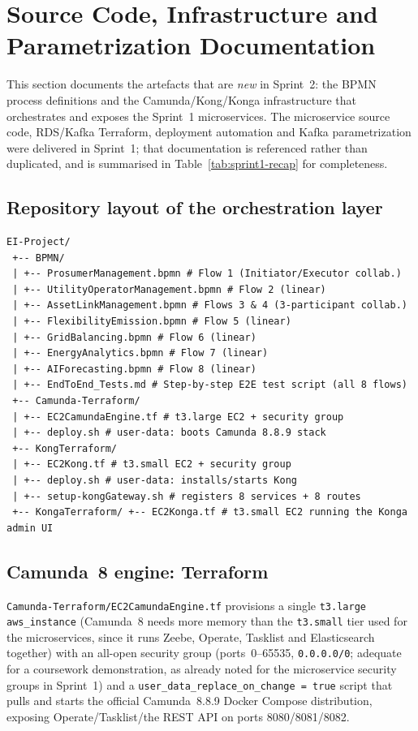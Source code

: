 \documentclass[11pt,a4paper]{article}
\begin{document}
\section{Source Code, Infrastructure and Parametrization Documentation}
\label{sec:docs}
 
This section documents the artefacts that are \emph{new} in Sprint~2:
the BPMN process definitions and the Camunda/Kong/Konga infrastructure that
orchestrates and exposes the Sprint~1 microservices. The microservice source
code, RDS/Kafka Terraform, deployment automation and Kafka parametrization
were delivered in Sprint~1;
that documentation is referenced rather than duplicated, and is summarised in
Table~\ref{tab:sprint1-recap} for completeness.
 
\subsection{Repository layout of the orchestration layer}
 
\begin{lstlisting}[caption={Layout of the new orchestration-layer artefacts inside the project repository}]
EI-Project/
 +-- BPMN/
 | +-- ProsumerManagement.bpmn # Flow 1 (Initiator/Executor collab.)
 | +-- UtilityOperatorManagement.bpmn # Flow 2 (linear)
 | +-- AssetLinkManagement.bpmn # Flows 3 & 4 (3-participant collab.)
 | +-- FlexibilityEmission.bpmn # Flow 5 (linear)
 | +-- GridBalancing.bpmn # Flow 6 (linear)
 | +-- EnergyAnalytics.bpmn # Flow 7 (linear)
 | +-- AIForecasting.bpmn # Flow 8 (linear)
 | +-- EndToEnd_Tests.md # Step-by-step E2E test script (all 8 flows)
 +-- Camunda-Terraform/
 | +-- EC2CamundaEngine.tf # t3.large EC2 + security group
 | +-- deploy.sh # user-data: boots Camunda 8.8.9 stack
 +-- KongTerraform/
 | +-- EC2Kong.tf # t3.small EC2 + security group
 | +-- deploy.sh # user-data: installs/starts Kong
 | +-- setup-kongGateway.sh # registers 8 services + 8 routes
 +-- KongaTerraform/ +-- EC2Konga.tf # t3.small EC2 running the Konga admin UI
\end{lstlisting}
 
\subsection{Camunda~8 engine: Terraform}
 
\texttt{Camunda-Terraform/EC2CamundaEngine.tf} provisions a single
\texttt{t3.large} \texttt{aws\_instance} (Camunda~8 needs more memory than the
\texttt{t3.small} tier used for the microservices, since it runs Zeebe,
Operate, Tasklist and Elasticsearch together) with an all-open security group
(ports~0--65535, \texttt{0.0.0.0/0}; adequate for a coursework
demonstration, as already noted for the microservice security groups in
Sprint~1) and a \texttt{user\_data\_replace\_on\_change = true} script that
pulls and starts the official Camunda~8.8.9 Docker Compose distribution,
exposing Operate/Tasklist/the REST API on ports 8080/8081/8082.
 
\end{document}
